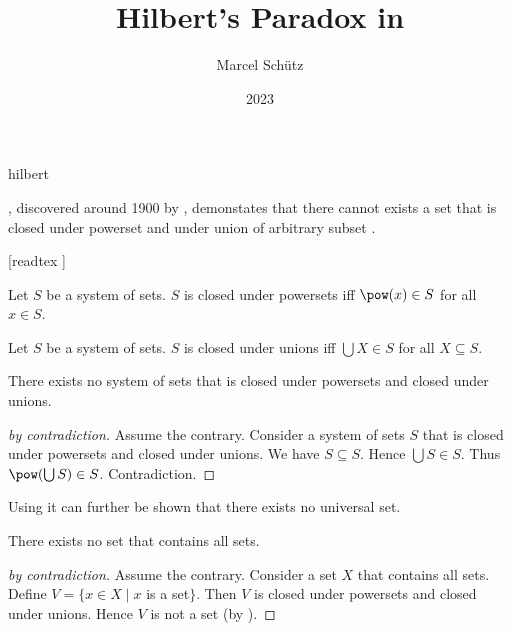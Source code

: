 \documentclass{stex}
\begin{document}
\title{Hilbert's Paradox in \Naproche}
\author{Marcel Schütz}
\date{2023}
\maketitle
\begin{smodule}{hilbert}
\begin{sparagraph}
  \noindent \emph{}, discovered around 1900 by , demonstates that there cannot exists a set that is closed under powerset and under union of arbitrary subset \cite{PeckhausKahl2002}.
\end{sparagraph}

\begin{forthel}
  [readtex ]

  \begin{definition*}
    Let $S$ be a system of sets.
    $S$ is closed under powersets iff $\pow(x) \in S$ for all $x \in S$.
  \end{definition*}

  \begin{definition*}
    Let $S$ be a system of sets.
    $S$ is closed under unions iff $\bigcup X \in S$ for all $X \subseteq S$.
  \end{definition*}

  \begin{theorem*}\label{hilbert_paradox}
    There exists no system of sets that is closed under powersets and closed under unions.
  \end{theorem*}
  \begin{proof}[ by contradiction]
    Assume the contrary.
    Consider a system of sets $S$ that is closed under powersets and closed under unions.
    We have $S \subseteq S$.
    Hence $\bigcup S \in S$.
    Thus $\pow(\bigcup S) \in S$.
    Contradiction.
  \end{proof}
\end{forthel}

\begin{sparagraph}
  \noindent Using  it can further be shown that there exists no universal set.
\end{sparagraph}

\begin{forthel}
  \begin{corollary*}
    There exists no set that contains all sets.
  \end{corollary*}
  \begin{proof}[ by contradiction]
    Assume the contrary.
    Consider a set $X$ that contains all sets.
    Define $V = \{ x \in X \mid x$ is a set$\}$.
    Then $V$ is closed under powersets and closed under unions.
    Hence $V$ is not a set (by ).
  \end{proof}
\end{forthel}
\end{smodule}
\printbibliography
\end{document}
